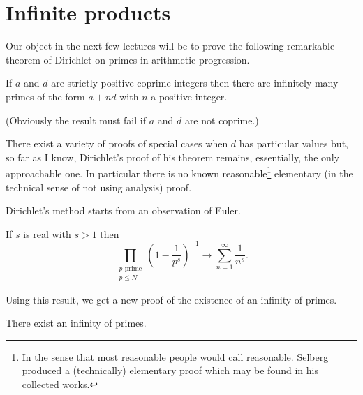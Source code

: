 \section{Infinite products} Our object in the next few
lectures will be to prove the following remarkable
theorem of Dirichlet on primes in arithmetic
progression.
\begin{theorem}[Dirichlet]\label{Dirichlet} 
If $a$ and $d$ are strictly
positive coprime integers then there are infinitely
many primes of the form $a+nd$ with $n$ a positive integer.
\end{theorem}
(Obviously the result must fail if $a$ and $d$ are not
coprime.) 

There exist a variety of proofs of special cases
when $d$ has particular values but, so far as I know,
Dirichlet's proof of his theorem remains, essentially,
the only approachable one. In particular there is no
known reasonable\footnote{In the sense that most
reasonable people would call reasonable. Selberg produced
a (technically)  elementary proof which may be found in his
collected works.} elementary
(in the technical sense of not using analysis) 
proof.

Dirichlet's method starts from an observation of Euler.
\begin{lemma}\label{Euler prime start}
If $s$ is real with $s>1$ then
\[\prod_{\substack{\text{$p$ prime}\\p\leq N}}
\left(1-\frac{1}{p^{s}}\right)^{-1}\rightarrow
\sum_{n=1}^{\infty}\frac{1}{n^{s}}.\]
\end{lemma}
Using this result, we get a new proof of the existence
of an infinity of primes.
\begin{theorem}[Euclid] There exist an infinity of primes.
\end{theorem}

